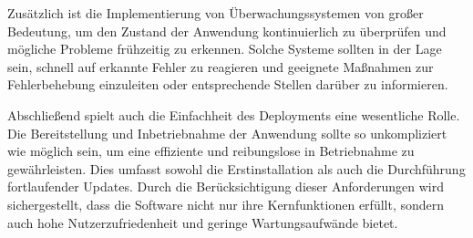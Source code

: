 Zusätzlich ist die Implementierung von Überwachungssystemen von großer Bedeutung, um den Zustand der Anwendung kontinuierlich zu überprüfen und mögliche Probleme frühzeitig zu erkennen. Solche Systeme sollten in der Lage sein, schnell 
auf erkannte Fehler zu reagieren und geeignete Maßnahmen zur Fehlerbehebung einzuleiten oder entsprechende Stellen darüber zu informieren.

Abschließend spielt auch die Einfachheit des Deployments eine wesentliche Rolle. Die Bereitstellung und Inbetriebnahme der Anwendung sollte so unkompliziert wie möglich sein, um eine effiziente und reibungslose in Betriebnahme zu 
gewährleisten. Dies umfasst sowohl die Erstinstallation als auch die Durchführung fortlaufender Updates. Durch die Berücksichtigung dieser 
Anforderungen wird sichergestellt, dass die Software nicht nur ihre Kernfunktionen erfüllt, sondern auch hohe Nutzerzufriedenheit und geringe Wartungsaufwände bietet.



